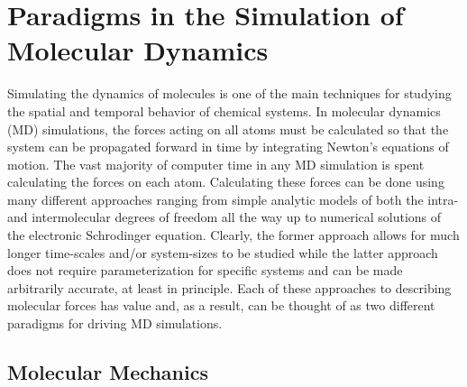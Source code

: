 \documentclass[11pt, proquest]{uwthesis}[2020/02/24]
\begin{document}
%
%

%
 
 
 
%
%

\textpages

\chapter{Paradigms in the Simulation of Molecular Dynamics}

Simulating the dynamics of molecules is one of the main techniques for studying the spatial and temporal behavior of chemical systems. In molecular dynamics (MD) simulations, the forces acting on all atoms must be calculated so that the system can be propagated forward in time by integrating Newton's equations of motion. The vast majority of computer time in any MD simulation is spent calculating the forces on each atom. Calculating these forces can be done using many different approaches ranging from simple analytic models of both the intra- and intermolecular degrees of freedom all the way up to numerical solutions of the electronic Schrodinger equation. Clearly, the former approach allows for much longer time-scales and/or system-sizes to be studied while the latter approach does not require parameterization for specific systems and can be made arbitrarily accurate, at least in principle. Each of these approaches to describing molecular forces has value and, as a result, can be thought of as two different paradigms for driving MD simulations.

\section{Molecular Mechanics}
\end{document}

